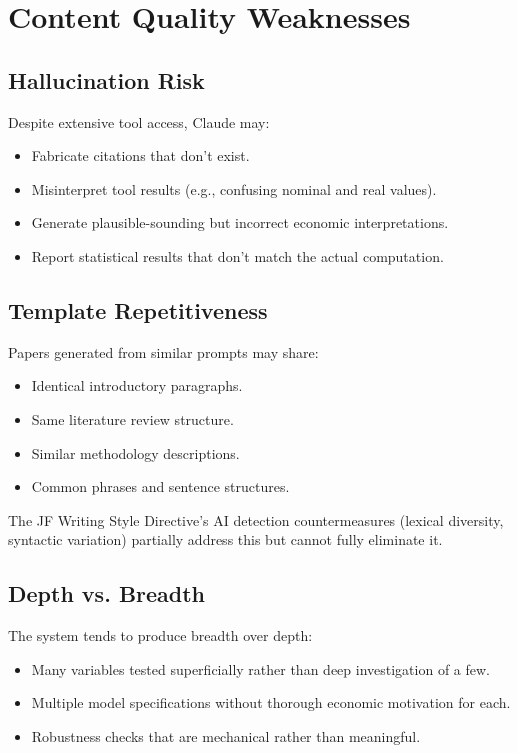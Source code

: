 \section{Content Quality Weaknesses}
\label{sec:weak:content}

\subsection{Hallucination Risk}

Despite extensive tool access, Claude may:
\begin{itemize}
  \item Fabricate citations that don't exist.
  \item Misinterpret tool results (e.g., confusing nominal and real values).
  \item Generate plausible-sounding but incorrect economic interpretations.
  \item Report statistical results that don't match the actual computation.
\end{itemize}

\subsection{Template Repetitiveness}

Papers generated from similar prompts may share:
\begin{itemize}
  \item Identical introductory paragraphs.
  \item Same literature review structure.
  \item Similar methodology descriptions.
  \item Common phrases and sentence structures.
\end{itemize}

The JF Writing Style Directive's AI detection countermeasures (lexical diversity, syntactic variation) partially address this but cannot fully eliminate it.

\subsection{Depth vs. Breadth}

The system tends to produce breadth over depth:
\begin{itemize}
  \item Many variables tested superficially rather than deep investigation of a few.
  \item Multiple model specifications without thorough economic motivation for each.
  \item Robustness checks that are mechanical rather than meaningful.
\end{itemize}

